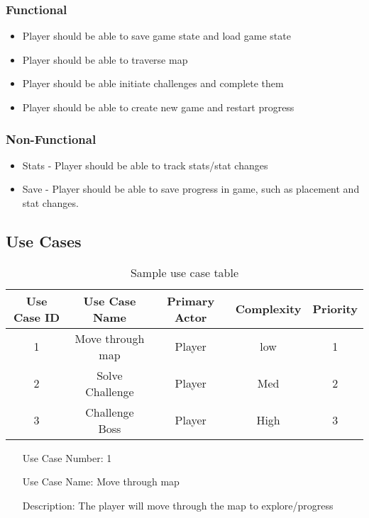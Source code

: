 \documentclass[10pt,conference,onecolumn,compsoc]{IEEEtran}
\begin{document}
\subsubsection{Functional}
\begin{itemize}
\item Player should be able to save game state and load game state 
\item Player should be able to traverse map
\item Player should be able initiate challenges and complete them
\item Player should be able to create new game and restart progress
\end{itemize}

\subsubsection{Non-Functional}
\begin{itemize}
\item Stats - Player should be able to track stats/stat changes
\item Save - Player should be able to save progress in game, such as placement and stat changes.
\end{itemize}

\subsection{Use Cases}
 
\begin{table}
\centering
\begin{tabular}{|c|c|c|c|c|}
\hline
Use Case ID & Use Case Name & Primary Actor & Complexity & Priority \\
\hline \hline
1 & Move through map & Player & low & 1\\
\hline
2 & Solve Challenge & Player & Med & 2\\
\hline
\hline
3 & Challenge Boss & Player & High & 3\\
\hline

\end{tabular}
\caption{Sample use case table}
\label{tab:useCaseIndex}
\end{table}


\begin{itemize}
\item[Use Case Number:] 1
\item[Use Case Name:] Move through map
\item[Description:] The player will move through the map to explore/progress
\end{itemize}
\end{document}
